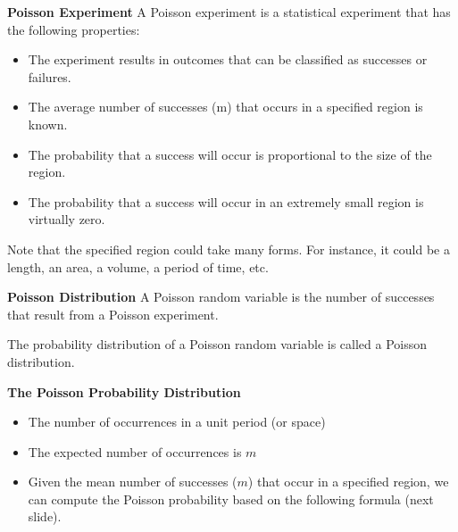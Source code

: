 \documentclass[a4]{beamer}
\begin{document}
{
\textbf{Poisson Experiment}
A Poisson experiment is a statistical experiment that has the following properties:
\begin{itemize}
\item The experiment results in outcomes that can be classified as successes or failures.
\item The average number of successes (m) that occurs in a specified region is known.
\item The probability that a success will occur is proportional to the size of the region.
\item The probability that a success will occur in an extremely small region is virtually zero.
\end{itemize}
Note that the specified region could take many forms. For instance, it could be a length, an area, a volume, a period of time, etc.
}

{
\textbf{Poisson Distribution}
A Poisson random variable is the number of successes that result from a Poisson experiment.

The probability distribution of a Poisson random variable is called a Poisson distribution.


}

{
\textbf{The Poisson Probability Distribution}
\begin{itemize}
\item The number of occurrences in a unit period (or space)
\item The expected number of occurrences is $m$
\item Given the mean number of successes ($m$) that occur in a specified region, we can compute the Poisson probability based on the following formula (next slide).
\end{itemize}
}
\end{document}
